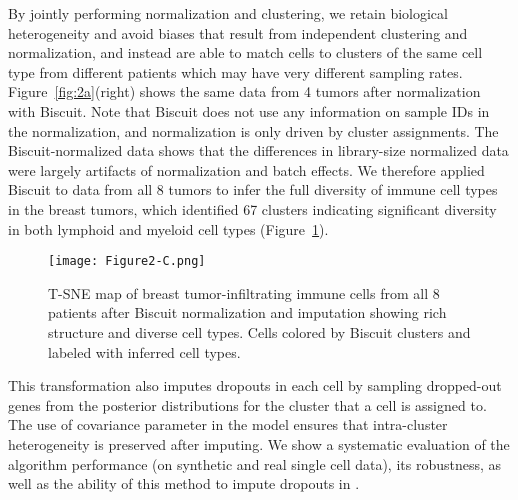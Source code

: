 By jointly performing normalization and clustering, we retain biological heterogeneity and avoid biases that result from independent clustering and normalization, and instead are able to match cells to clusters of the same cell type from different patients which may have very different sampling rates. 
Figure~\ref{fig:2a}(right) shows the same data from 4 tumors after normalization with Biscuit. 
Note that Biscuit does not use any information on sample IDs in the normalization, and normalization is only driven by cluster assignments. 
The Biscuit-normalized data shows that the differences in library-size normalized data were largely artifacts of normalization and batch effects. 
We therefore applied Biscuit to data from all 8 tumors to infer the full diversity of immune cell types in the breast tumors, which identified 67 clusters indicating significant diversity in both lymphoid and myeloid cell types (Figure~\ref{fig:2c}). %

\begin{figure}
\centering
\texttt{[image: Figure2-C.png]}
\caption{T-SNE map of breast tumor-infiltrating immune cells from all 8 patients after Biscuit normalization and imputation showing rich structure and diverse cell types. Cells colored by Biscuit clusters and labeled with inferred cell types.
}
\label{fig:2c}
\end{figure}

This transformation also imputes dropouts in each cell by sampling dropped-out genes from the posterior distributions for the cluster that a cell is assigned to. 
The use of covariance parameter in the model ensures that intra-cluster heterogeneity is preserved after imputing. 
We show a systematic evaluation of the algorithm performance (on synthetic and real single cell data), its robustness, as well as the ability of this method to impute dropouts in \citep{Prabhakaran2016}.


